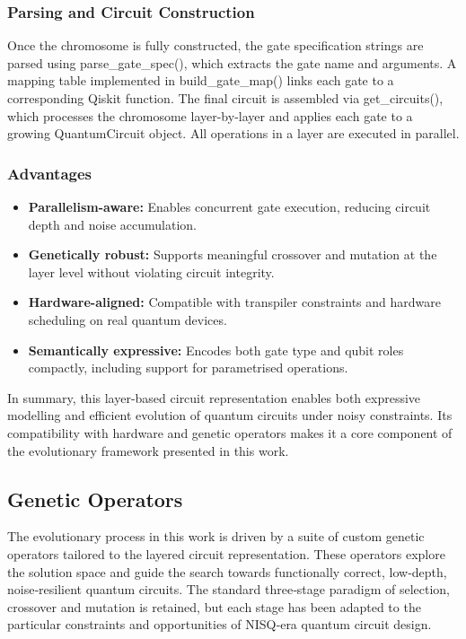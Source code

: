 \documentclass[11pt,a4paper]{article}
\begin{document}
\subsubsection*{Parsing and Circuit Construction}
Once the chromosome is fully constructed, the gate specification strings are parsed using parse\_gate\_spec(), which extracts the gate name and arguments. A mapping table implemented in build\_gate\_map() links each gate to a corresponding Qiskit function. The final circuit is assembled via get\_circuits(), which processes the chromosome layer-by-layer and applies each gate to a growing QuantumCircuit object. All operations in a layer are executed in parallel.

\subsubsection*{Advantages}
\begin{itemize}
    \item \textbf{Parallelism-aware:} Enables concurrent gate execution, reducing circuit depth and noise accumulation.
    \item \textbf{Genetically robust:} Supports meaningful crossover and mutation at the layer level without violating circuit integrity.
    \item \textbf{Hardware-aligned:} Compatible with transpiler constraints and hardware scheduling on real quantum devices.
    \item \textbf{Semantically expressive:} Encodes both gate type and qubit roles compactly, including support for parametrised operations.
\end{itemize}

In summary, this layer-based circuit representation enables both expressive modelling and efficient evolution of quantum circuits under noisy constraints. Its compatibility with hardware and genetic operators makes it a core component of the evolutionary framework presented in this work.

\subsection{Genetic Operators}
The evolutionary process in this work is driven by a suite of custom genetic operators tailored to the layered circuit representation. These operators explore the solution space and guide the search towards functionally correct, low‐depth, noise‐resilient quantum circuits. The standard three‐stage paradigm of selection, crossover and mutation is retained, but each stage has been adapted to the particular constraints and opportunities of NISQ‐era quantum circuit design.
\end{document}
